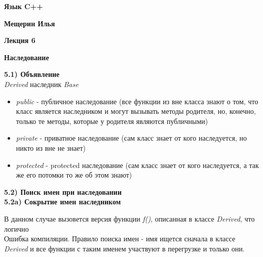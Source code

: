 \documentclass{article}
\begin{document}
	
\begin{center}
	\begin{LARGE}
		\textbf{Язык C++}
	\end{LARGE}
\end{center}
\begin{center}
	\begin{normalsize}
		\textbf{Мещерин Илья}
	\end{normalsize}
\end{center}
\begin{center}
	\begin{Large}
		\textbf{Лекция 6}
	\end{Large}
\end{center}

\begin{center}
	\begin{large}
		\textbf{Наследование}
	\end{large}
\end{center}

\noindent \textbf{5.1) Объявление}\\
\textit{Derived} наследник \textit{Base}

\begin{itemize}
	\item \textit{public} - публичное наследование (все функции из вне класса знают о том, что класс является наследником и могут вызывать методы родителя, но, конечно, только те методы, которые у родителя являются публичными)
	\item \textit{private} - приватное наследование (сам класс знает от кого наследуется, но никто из вне не знает)
	\item \textit{protected} - protected наследование (сам класс знает от кого наследуется, а так же его потомки то же об этом знают)
\end{itemize}
\textbf{5.2) Поиск имен при наследовании}\\
\textbf{5.2a) Сокрытие имен наследником}

В данном случае вызовется версия функции \textit{f()}, описанная в классе \textit{Derived}, что логично\\

Ошибка компиляции. Правило поиска имен - имя ищется сначала в классе \textit{Derived} и все функции с таким именем участвуют в перегрузке и только они.
\end{document}
